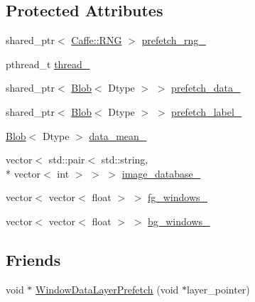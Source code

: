 \subsection*{Protected Attributes}
\begin{DoxyCompactItemize}
\item 
shared\+\_\+ptr$<$ \hyperlink{classcaffe_1_1_caffe_1_1_r_n_g}{Caffe\+::\+R\+N\+G} $>$ \hyperlink{classcaffe_1_1_window_data_layer_afa989509237083d73a6e77935883587b}{prefetch\+\_\+rng\+\_\+}
\item 
pthread\+\_\+t \hyperlink{classcaffe_1_1_window_data_layer_aeea55aee8772811aeaa7e0e850544002}{thread\+\_\+}
\item 
shared\+\_\+ptr$<$ \hyperlink{classcaffe_1_1_blob}{Blob}$<$ Dtype $>$ $>$ \hyperlink{classcaffe_1_1_window_data_layer_a7f49a5a0174aa586f6e7eac9a2304bf0}{prefetch\+\_\+data\+\_\+}
\item 
shared\+\_\+ptr$<$ \hyperlink{classcaffe_1_1_blob}{Blob}$<$ Dtype $>$ $>$ \hyperlink{classcaffe_1_1_window_data_layer_a95ecf97b6510d6e3d55ded383f3fce3b}{prefetch\+\_\+label\+\_\+}
\item 
\hyperlink{classcaffe_1_1_blob}{Blob}$<$ Dtype $>$ \hyperlink{classcaffe_1_1_window_data_layer_a35f69e1d231f036c4a1718eb89ade23f}{data\+\_\+mean\+\_\+}
\item 
vector$<$ std\+::pair$<$ std\+::string, \\*
vector$<$ int $>$ $>$ $>$ \hyperlink{classcaffe_1_1_window_data_layer_a6b2fa458b81345ca8a65f8b473584ea8}{image\+\_\+database\+\_\+}
\item 
vector$<$ vector$<$ float $>$ $>$ \hyperlink{classcaffe_1_1_window_data_layer_ac78c9c3671b5116a432c221ebd2c656f}{fg\+\_\+windows\+\_\+}
\item 
vector$<$ vector$<$ float $>$ $>$ \hyperlink{classcaffe_1_1_window_data_layer_a9b25a230a66e8d289f02c2d872fc816c}{bg\+\_\+windows\+\_\+}
\end{DoxyCompactItemize}
\subsection*{Friends}
\begin{DoxyCompactItemize}
\item 
void $\ast$ \hyperlink{classcaffe_1_1_window_data_layer_a83105f7f96bbfc7981db9ce1d9bce98d}{Window\+Data\+Layer\+Prefetch} (void $\ast$layer\+\_\+pointer)
\end{DoxyCompactItemize}


